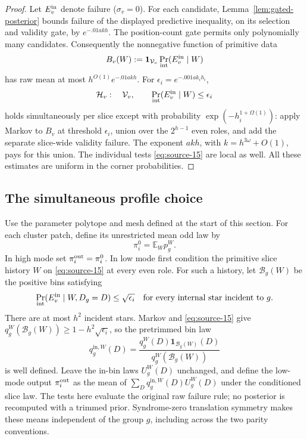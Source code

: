 \begin{proof}
Let \(E_v^{\rm in}\) denote failure (\(\sigma_v=0\)). For each candidate, Lemma~\ref{lem:gated-posterior} bounds failure of the displayed predictive inequality, on its selection and validity gate, by \(e^{-.01akh}\). The position-count gate permits only polynomially many candidates. Consequently the nonnegative function of primitive data
\[
 B_v(W):=\mathbf1_{\mathcal V_v}\Pr_{\rm int}(E_v^{\rm in}\mid W)
\]
has raw mean at most \(h^{O(1)}e^{-.01akh}\). For \(\epsilon_i=e^{-.001a k_i h_i}\),
\begin{equation}
 \mathcal H_v:\quad \mathcal V_v,\qquad
     \Pr_{\rm int}(E_v^{\rm in}\mid W)\le\epsilon_i
 \label{eq:source-15}
\end{equation}
holds simultaneously per slice except with probability \(\exp(-h_i^{1+\Omega(1)})\): apply Markov to \(B_v\) at threshold \(\epsilon_i\), union over the \(2^{h-1}\) even roles, and add the separate slice-wide validity failure. The exponent \(akh\), with \(k=h^{3\omega}+O(1)\), pays for this union. The individual tests \eqref{eq:source-15} are local as well. All these estimates are uniform in the corner probabilities.
\end{proof}

\subsection{The simultaneous profile choice}
\label{sec:internal-profile-choice}

Use the parameter polytope and mesh defined at the start of this section. For each cluster patch, define its unrestricted mean odd law by
\[
 \pi_i^0=\mathbb E_W p_g^W.
\]
In high mode set \(\pi_i^{\rm out}=\pi_i^0\). In low mode first condition the primitive slice history \(W\) on \eqref{eq:source-15} at every even role. For such a history, let \(\mathcal B_g(W)\) be the positive bins satisfying
\[
 \Pr_{\rm int}(E_v^{\rm in}\mid W,D_g=D)\le\sqrt{\epsilon_i}
 \quad\text{for every internal star incident to }g.
\]
There are at most \(h^2\) incident stars. Markov and \eqref{eq:source-15} give \(q_g^W(\mathcal B_g(W))\ge1-h^2\sqrt{\epsilon_i}\), so the pretrimmed bin law
\[
 q_g^{\mathrm{in},W}(D)=
 \frac{q_g^W(D)\mathbf1_{\mathcal B_g(W)}(D)}
      {q_g^W(\mathcal B_g(W))}
\]
is well defined. Leave the in-bin laws \(U_g^W(D)\) unchanged, and define the low-mode output \(\pi_i^{\rm out}\) as the mean of \(\sum_Dq_g^{\mathrm{in},W}(D)U_g^W(D)\) under the conditioned slice law. The tests here evaluate the original raw failure rule; no posterior is recomputed with a trimmed prior. Syndrome-zero translation symmetry makes these means independent of the group \(g\), including across the two parity conventions.

